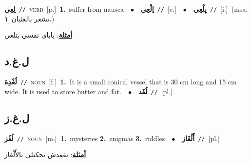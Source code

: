 \documentclass[10pt,a4paper,twoside]{article} %
\begin{document}
\begin{multicols}{2}
{\setlength\topsep{0pt}\textbf{\foreignlanguage{arabic}{لِعِي}}\ {\color{gray}\texttt{//}\color{black}}\ \textsc{verb}\ [p.]\ \textbf{1.}~suffer from nausea\ \ $\bullet$\ \ \setlength\topsep{0pt}\textbf{\foreignlanguage{arabic}{اِلْعِي}}\ {\color{gray}\texttt{//}\color{black}}\ [c.]\ \ $\bullet$\ \ \setlength\topsep{0pt}\textbf{\foreignlanguage{arabic}{يِلْعِي}}\ {\color{gray}\texttt{//}\color{black}}\ [i.]\ \color{gray}(msa. \foreignlanguage{arabic}{يشعر بالغثيان}~\foreignlanguage{arabic}{\textbf{١.}})\color{black}\  \begin{flushright}\color{gray}\foreignlanguage{arabic}{\textbf{\underline{\foreignlanguage{arabic}{أمثلة}}}: ياباي نفسي بتلعي}\end{flushright}\color{black}} \vspace{2mm}

\vspace{-3mm}
\subsection*{\color{blue}\foreignlanguage{arabic}{ل.غ.د}\color{blue}{}} 

{\setlength\topsep{0pt}\textbf{\foreignlanguage{arabic}{لُغْدِة}}\ {\color{gray}\texttt{//}\color{black}}\ \textsc{noun}\ [f.]\ \textbf{1.}~It is a small conical vessel that is 30 cm long and 15 cm wide. It is used to store butter and fat.\ \ $\bullet$\ \ \setlength\topsep{0pt}\textbf{\foreignlanguage{arabic}{لُغَد}}\ {\color{gray}\texttt{//}\color{black}}\ [pl.]\ } \vspace{2mm}

\vspace{-3mm}
\subsection*{\color{blue}\foreignlanguage{arabic}{ل.غ.ز}\color{blue}{}} 

{\setlength\topsep{0pt}\textbf{\foreignlanguage{arabic}{لُغُز}}\ {\color{gray}\texttt{//}\color{black}}\ \textsc{noun}\ [m.]\ \textbf{1.}~mysteries  \textbf{2.}~enigmas  \textbf{3.}~riddles\ \ $\bullet$\ \ \setlength\topsep{0pt}\textbf{\foreignlanguage{arabic}{أَلْغَاز}}\ {\color{gray}\texttt{//}\color{black}}\ [pl.]\  \begin{flushright}\color{gray}\foreignlanguage{arabic}{\textbf{\underline{\foreignlanguage{arabic}{أمثلة}}}: تقعدش تحكيلي بالأَلْغاز}\end{flushright}\color{black}} \vspace{2mm}


\end{multicols}
\end{document}
